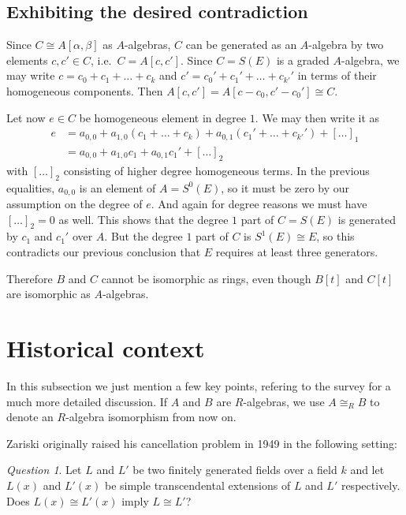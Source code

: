 \documentclass[A4paper, 12pt, british, reqno]{amsart}
\theoremstyle{plain}
\theoremstyle{definition}
\theoremstyle{remark}
\newtheorem{q}[thm]{Question}
\theoremstyle{plain}
\theoremstyle{definition}
\theoremstyle{remark}
\theoremstyle{plain}
\theoremstyle{definition}
\theoremstyle{remark}
\begin{document}
\subsection{Exhibiting the desired contradiction}
Since $C\cong A[\alpha,\beta]$ as $A$-algebras, $C$ can be generated as an $A$-algebra by two elements $c,c'\in C$, i.e.~$C=A[c,c']$.
Since $C=S(E)$ is a graded $A$-algebra, we may write $c=c_{0}+c_{1}+\ldots+c_{k}$ and $c'=c_{0}'+c_{1}'+\ldots+c_{k'}'$ in terms of their homogeneous components.
Then $A[c,c']=A[c-c_{0},c'-c_{0}']\cong C$.

Let now $e\in C$ be homogeneous element in degree $1$.
We may then write it as
\begin{align*}
    e & = a_{0,0}+a_{1,0}(c_{1}+\ldots+c_{k})+a_{0,1}(c_{1}'+\ldots+c_{k'}')+ [\ldots]_{1} \\
    & = a_{0,0}+a_{1,0}c_{1}+a_{0,1}c_{1}'+[\ldots]_{2}
\end{align*}
with $[\ldots]_{2}$ consisting of higher degree homogeneous terms.
In the previous equalities, $a_{0,0}$ is an element of $A=S^{0}(E)$, so it must be zero by our assumption on the degree of $e$.
And again for degree reasons we must have $[\ldots]_{2}=0$ as well.
This shows that the degree $1$ part of $C=S(E)$ is generated by $c_{1}$ and $c_{1}'$ over $A$.
But the degree $1$ part of $C$ is $S^{1}(E)\cong E$, so this contradicts our previous conclusion that $E$ requires at least three generators.

Therefore $B$ and $C$ cannot be isomorphic as rings, even though $B[t]$ and $C[t]$ are isomorphic as $A$-algebras.

\section{Historical context}

In this subsection we just mention a few key points, refering to the survey \cite{gup15} for a much more detailed discussion.
If $A$ and $B$ are $R$-algebras, we use $A\cong_{R} B$ to denote an $R$-algebra isomorphism from now on.

Zariski originally raised his cancellation problem in 1949 in the following setting:

\begin{q}
    Let $L$ and $L'$ be two finitely generated fields over a field $k$ and let $L(x)$ and $L'(x)$ be simple transcendental extensions of $L$ and $L'$ respectively.
    Does $L(x)\cong L'(x)$ imply $L\cong L'$?
\end{q}
\end{document}
